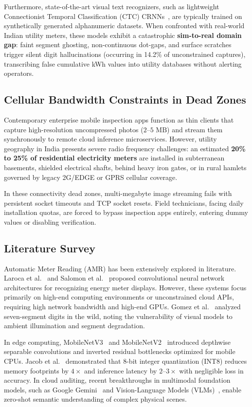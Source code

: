 \documentclass[12pt,a4paper,oneside]{report}
\begin{document}
Furthermore, state-of-the-art visual text recognizers, such as lightweight Connectionist Temporal Classification (CTC) CRNNs~\cite{shi2016end}, are typically trained on synthetically generated alphanumeric datasets. When confronted with real-world Indian utility meters, these models exhibit a catastrophic \textbf{sim-to-real domain gap}: faint segment ghosting, non-continuous dot-gaps, and surface scratches trigger silent digit hallucinations (occurring in 14.2\% of unconstrained captures), transcribing false cumulative kWh values into utility databases without alerting operators.

\subsection{Cellular Bandwidth Constraints in Dead Zones}
Contemporary enterprise mobile inspection apps function as thin clients that capture high-resolution uncompressed photos ($2\text{--}5\text{~MB}$) and stream them synchronously to remote cloud inference microservices. However, utility geography in India presents severe radio frequency challenges: an estimated \textbf{20\% to 25\% of residential electricity meters} are installed in subterranean basements, shielded electrical shafts, behind heavy iron gates, or in rural hamlets governed by legacy 2G/EDGE or GPRS cellular coverage.

In these connectivity dead zones, multi-megabyte image streaming fails with persistent socket timeouts and TCP socket resets. Field technicians, facing daily installation quotas, are forced to bypass inspection apps entirely, entering dummy values or disabling verification.

\subsection{Literature Survey}
Automatic Meter Reading (AMR) has been extensively explored in literature. Laroca et al.~\cite{laroca2019convolutional} and Salomon et al.~\cite{salomon2020deep} proposed convolutional neural network architectures for recognizing energy meter displays. However, these systems focus primarily on high-end computing environments or unconstrained cloud APIs, requiring high network bandwidth and high-end GPUs. Gomez et al.~\cite{gomez2018reading} analyzed seven-segment digits in the wild, noting the vulnerability of visual models to ambient illumination and segment degradation.

In edge computing, MobileNetV3~\cite{howard2019searching} and MobileNetV2~\cite{sandler2018mobilenetv2} introduced depthwise separable convolutions and inverted residual bottlenecks optimized for mobile CPUs. Jacob et al.~\cite{jacob2018quantization} demonstrated that 8-bit integer quantization (INT8) reduces memory footprints by $4\times$ and inference latency by $2\text{--}3\times$ with negligible loss in accuracy. In cloud auditing, recent breakthroughs in multimodal foundation models, such as Google Gemini~\cite{gemini2023team} and Vision-Language Models (VLMs)~\cite{liu2024visual}, enable zero-shot semantic understanding of complex physical scenes.
\end{document}
